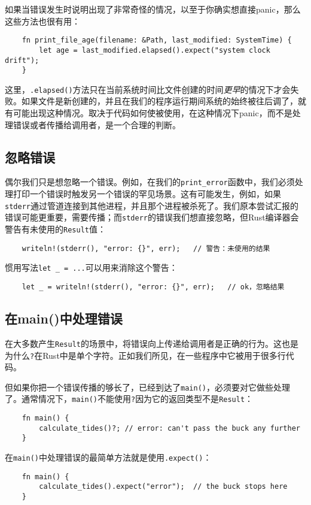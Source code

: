 如果当错误发生时说明出现了非常奇怪的情况，以至于你确实想直接panic，那么这些方法也很有用：
\begin{verbatim}
    fn print_file_age(filename: &Path, last_modified: SystemTime) {
        let age = last_modified.elapsed().expect("system clock drift");
    }
\end{verbatim}

这里，\texttt{.elapsed()}方法只在当前系统时间比文件创建的时间\emph{更早}的情况下才会失败。如果文件是新创建的，并且在我们的程序运行期间系统的始终被往后调了，就有可能出现这种情况。取决于代码如何使被使用，在这种情况下panic，而不是处理错误或者传播给调用者，是一个合理的判断。

\subsection{忽略错误}\label{ignoreerr}
偶尔我们只是想忽略一个错误。例如，在我们的\texttt{print\_error}函数中，我们必须处理打印一个错误时触发另一个错误的罕见场景。这有可能发生，例如，如果\texttt{stderr}通过管道连接到其他进程，并且那个进程被杀死了。我们原本尝试汇报的错误可能更重要，需要传播；而\texttt{stderr}的错误我们想直接忽略，但Rust编译器会警告有未使用的\texttt{Result}值：
\begin{verbatim}
    writeln!(stderr(), "error: {}", err);   // 警告：未使用的结果
\end{verbatim}

惯用写法\texttt{let \_ = ...}可以用来消除这个警告：
\begin{verbatim}
    let _ = writeln!(stderr(), "error: {}", err);   // ok，忽略结果
\end{verbatim}

\subsection{在main()中处理错误}
在大多数产生\texttt{Result}的场景中，将错误向上传递给调用者是正确的行为。这也是为什么\texttt{?}在Rust中是单个字符。正如我们所见，在一些程序中它被用于很多行代码。

但如果你把一个错误传播的够长了，已经到达了\texttt{main()}，必须要对它做些处理了。通常情况下，\texttt{main()}不能使用\texttt{?}因为它的返回类型不是\texttt{Result}：
\begin{verbatim}
    fn main() {
        calculate_tides()?; // error: can't pass the buck any further
    }
\end{verbatim}

在\texttt{main()}中处理错误的最简单方法就是使用\texttt{.expect()}：
\begin{verbatim}
    fn main() {
        calculate_tides().expect("error");  // the buck stops here
    }
\end{verbatim}

